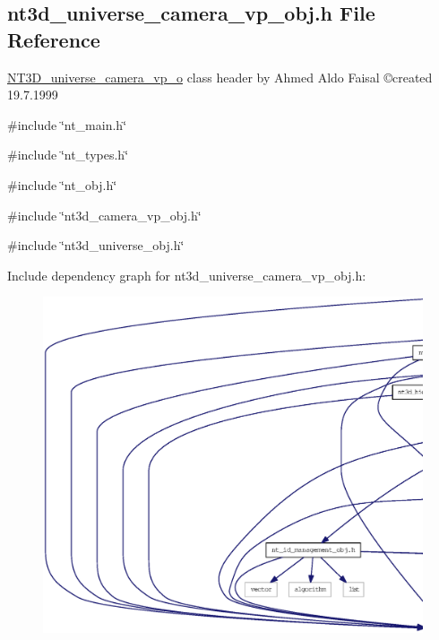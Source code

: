 \subsection{nt3d\_\-universe\_\-camera\_\-vp\_\-obj.h File Reference}
\label{nt3d__universe__camera__vp__obj_8h}



\begin{DoxyItemize}
\item \hyperlink{class_n_t3_d__universe__camera__vp__o}{NT3D\_\-universe\_\-camera\_\-vp\_\-o} class header by Ahmed Aldo Faisal \copyright created 19.7.1999 
\end{DoxyItemize} 


{\ttfamily \#include \char`\"{}nt\_\-main.h\char`\"{}}\par
{\ttfamily \#include \char`\"{}nt\_\-types.h\char`\"{}}\par
{\ttfamily \#include \char`\"{}nt\_\-obj.h\char`\"{}}\par
{\ttfamily \#include \char`\"{}nt3d\_\-camera\_\-vp\_\-obj.h\char`\"{}}\par
{\ttfamily \#include \char`\"{}nt3d\_\-universe\_\-obj.h\char`\"{}}\par
Include dependency graph for nt3d\_\-universe\_\-camera\_\-vp\_\-obj.h:
\nopagebreak
\begin{figure}[H]
\begin{center}
\leavevmode
\includegraphics[width=400pt]{nt3d__universe__camera__vp__obj_8h__incl}
\end{center}
\end{figure}
